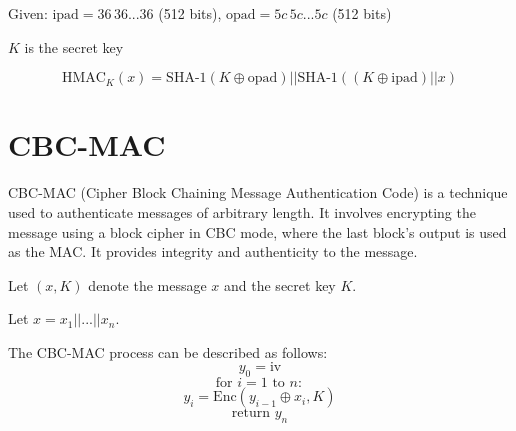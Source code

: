 \documentclass[11pt]{article}
\begin{document}
Given: \( \text{ipad} = 36 \, 36...36 \) (512 bits), \( \text{opad} = 5c \, 5c...5c \) (512 bits)

\( K \) is the secret key

\[ \text{HMAC}_K(x) = \text{SHA-1}(K \oplus \text{opad}) || \text{SHA-1}((K \oplus \text{ipad}) || x) \]

\section{CBC-MAC}

CBC-MAC (Cipher Block Chaining Message Authentication Code) is a technique used to authenticate messages of arbitrary length. It involves encrypting the message using a block cipher in CBC mode, where the last block's output is used as the MAC. It provides integrity and authenticity to the message.

Let \( (x, K) \) denote the message \( x \) and the secret key \( K \).

Let \( x = x_1 || ... || x_n \).

The CBC-MAC process can be described as follows:
\[ y_0 = \text{iv} \]
\[ \text{for } i = 1 \text{ to } n: \]
\[ y_i = \text{Enc}(y_{i-1} \oplus x_i, K) \]
\[ \text{return } y_n \]
\end{document}
